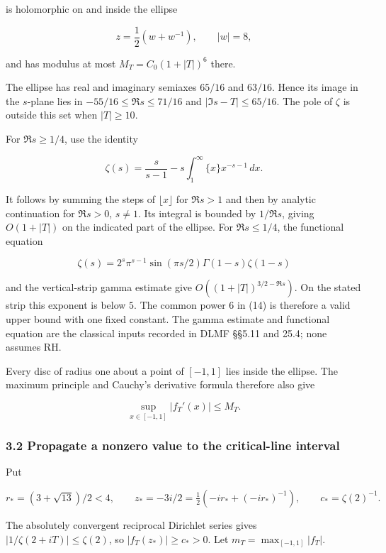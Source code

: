 \documentclass[11pt,a4paper]{article}
\begin{document}
is holomorphic on and inside the ellipse

\[
 z=\frac12(w+w^{-1}),\qquad |w|=8,
                                                                         \tag{15}
\]

and has modulus at most \(M_T=C_0(1+|T|)^6\) there.

The ellipse has real and imaginary semiaxes \(65/16\) and \(63/16\). Hence its image in the \(s\)-plane lies in \(-55/16\le\Re s\le71/16\) and \(|\Im s-T|\le65/16\). The pole of \(\zeta\) is outside this set when \(|T|\ge10\).

For \(\Re s\ge1/4\), use the identity

\[
 \zeta(s)=\frac{s}{s-1}-s\int_1^\infty\{x\}x^{-s-1}\,dx.              \tag{16}
\]

It follows by summing the steps of \(\lfloor x\rfloor\) for \(\Re s>1\) and then by analytic continuation for \(\Re s>0\), \(s\ne1\). Its integral is bounded by \(1/\Re s\), giving \(O(1+|T|)\) on the indicated part of the ellipse. For \(\Re s\le1/4\), the functional equation

\[
 \zeta(s)=2^s\pi^{s-1}\sin(\pi s/2)\Gamma(1-s)\zeta(1-s)              \tag{17}
\]

and the vertical-strip gamma estimate give \(O((1+|T|)^{3/2-\Re s})\). On the stated strip this exponent is below \(5\). The common power \(6\) in (14) is therefore a valid upper bound with one fixed constant. The gamma estimate and functional equation are the classical inputs recorded in DLMF §§5.11 and 25.4; none assumes RH.

Every disc of radius one about a point of \([-1,1]\) lies inside the ellipse. The maximum principle and Cauchy's derivative formula therefore also give

\[
 \sup_{x\in[-1,1]}|f_T'(x)|\le M_T.                                    \tag{18}
\]

\subsubsection{3.2 Propagate a nonzero value to the critical-line interval}\label{zlm:endpoint-arithmetic_original--propagate-a-nonzero-value-to-the-critical-line-interval}

Put

\[
 r_*=(3+\sqrt{13})/2<4,\qquad
 z_*=-3i/2=\tfrac12(-ir_*+(-ir_*)^{-1}),\qquad
 c_* =\zeta(2)^{-1}.                                                    \tag{19}
\]

The absolutely convergent reciprocal Dirichlet series gives \(|1/\zeta(2+iT)|\le\zeta(2)\), so \(|f_T(z_*)|\ge c_*>0\). Let \(m_T=\max_{[-1,1]}|f_T|\).
\end{document}
